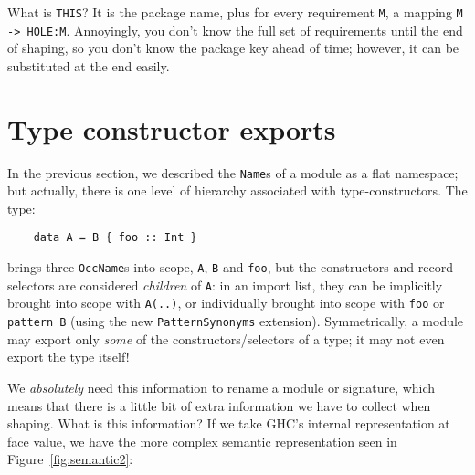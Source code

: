 \documentclass{article}
\begin{document}
What is \verb|THIS|?  It is the package name, plus for every requirement \verb|M|,
a mapping \verb|M -> HOLE:M|.  Annoyingly, you don't know the full set of
requirements until the end of shaping, so you don't know the package key ahead of time;
however, it can be substituted at the end easily.

\clearpage
\newpage

\section{Type constructor exports}

In the previous section, we described the \verb|Name|s of a
module as a flat namespace; but actually, there is one level of
hierarchy associated with type-constructors.  The type:

\begin{verbatim}
    data A = B { foo :: Int }
\end{verbatim}
%
brings three \verb|OccName|s into scope, \verb|A|, \verb|B|
and \verb|foo|, but the constructors and record selectors are
considered \emph{children}
of \verb|A|: in an import list, they can be implicitly brought
into scope with \verb|A(..)|, or individually brought into
scope with \verb|foo| or \verb|pattern B| (using the new \verb|PatternSynonyms|
extension).  Symmetrically, a module may export only \emph{some}
of the constructors/selectors of a type; it may not even
export the type itself!

We \emph{absolutely} need this information to rename a module or
signature, which means that there is a little bit of extra information
we have to collect when shaping.  What is this information?  If we take
GHC's internal representation at face value, we have the more complex
semantic representation seen in Figure~\ref{fig:semantic2}:
\end{document}
